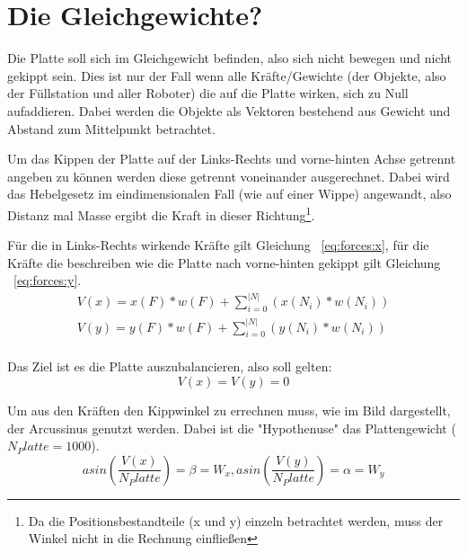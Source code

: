 \clearpage
\section{Die Gleichgewichte?}
Die Platte soll sich im Gleichgewicht befinden, also sich nicht bewegen und nicht gekippt sein. Dies ist nur der Fall wenn alle Kr{\"{a}}fte/Gewichte (der Objekte, also der F{\"{u}}llstation und aller Roboter) die auf die Platte wirken, sich zu Null aufaddieren. Dabei werden die Objekte als Vektoren bestehend aus Gewicht und Abstand zum Mittelpunkt betrachtet.

Um das Kippen der Platte auf der Links-Rechts und vorne-hinten Achse getrennt angeben zu k{\"{o}}nnen werden diese getrennt voneinander ausgerechnet. Dabei wird das Hebelgesetz im eindimensionalen Fall (wie auf einer Wippe) angewandt, also Distanz mal Masse ergibt die Kraft in dieser Richtung\footnote{Da die Positionsbestandteile (x und y) einzeln betrachtet werden, muss der Winkel nicht in die Rechnung einflie{\ss}en}.

F{\"{u}}r die in Links-Rechts wirkende Kr{\"{a}}fte gilt Gleichung ~\ref{eq:forces:x}, f{\"{u}}r die Kr{\"{a}}fte die beschreiben wie die Platte nach vorne-hinten gekippt gilt Gleichung ~\ref{eq:forces:y}.
\begin{subequations}\label{eq:forces}
\begin{align}
	V(x) = x(F) * w(F) + \sum_{i=0}^{|N|} ( x(N_i) * w(N_i) ) \label{eq:forces:x}\\
	V(y) = y(F) * w(F) + \sum_{i=0}^{|N|} ( y(N_i) * w(N_i) ) \label{eq:forces:y}\\
\end{align}
\end{subequations}

Das Ziel ist es die Platte auszubalancieren, also soll gelten:
\begin{equation}\label{eq:gleichgewicht}
	V(x) = V(y) = 0
\end{equation}

Um aus den Kr{\"{a}}ften den Kippwinkel zu errechnen muss, wie im Bild dargestellt, der Arcussinus genutzt werden. Dabei ist die "Hypothenuse" das Plattengewicht ($ N_Platte = 1000$). 
$$ asin(\frac{V(x)}{ N_Platte}) = \beta = W_{x}, asin(\frac{V(y)}{N_Platte}) = \alpha = W_{y} $$


